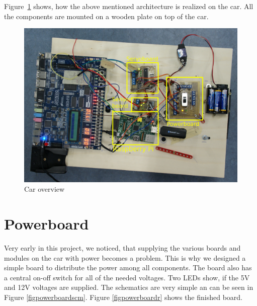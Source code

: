 \documentclass[a4paper
               ,10pt
               ,DIV=10 %
               ,BCOR=0.3cm
               ,pagesize %
               ,headings=small
               ,bibtotoc
               ]
               {scrartcl}
\begin{document}
Figure~\ref{figcaroverview} shows, how the above mentioned architecture is realized on the car. All the components are mounted on a wooden plate on top of the car.
\begin{figure}[H]
\begin{center}
\includegraphics[width=\linewidth]{pic/overview}
\caption{Car overview}
\label{figcaroverview}
\end{center}
\end{figure}

\section{Powerboard}

Very early in this project, we noticed, that supplying the various boards and modules on the car with power becomes a problem.
This is why we designed a simple board to distribute the power among all components.
The board also has a central on-off switch for all of the needed voltages.
Two LEDs show, if the 5V and 12V voltages are supplied.
The schematics are very simple an can be seen in Figure \ref{figpowerboardscm}. Figure \ref{figpowerboardr} shows the finished board.
\end{document}
